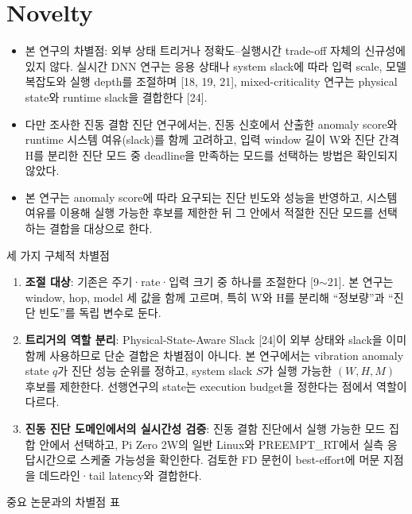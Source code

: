 \documentclass[10pt]{article}
\begin{document}
\section{Novelty}
\begin{itemize}
\item 본 연구의 차별점: 외부 상태 트리거나 정확도--실행시간 trade-off 자체의 신규성에 있지 않다. 실시간 DNN 연구는 응용 상태나 system slack에 따라 입력 scale, 모델 복잡도와 실행 depth를 조절하며 [18, 19, 21], mixed-criticality 연구는 physical state와 runtime slack을 결합한다 [24].
\item 다만 조사한 진동 결함 진단 연구에서는, 진동 신호에서 산출한 anomaly score와 runtime 시스템 여유(slack)를 함께 고려하고, 입력 window 길이 W와 진단 간격 H를 분리한 진단 모드 중 deadline을 만족하는 모드를 선택하는 방법은 확인되지 않았다.
\item 본 연구는 anomaly score에 따라 요구되는 진단 빈도와 성능을 반영하고, 시스템 여유를 이용해 실행 가능한 후보를 제한한 뒤 그 안에서 적절한 진단 모드를 선택하는 결합을 대상으로 한다.
\end{itemize}
\noindent 세 가지 구체적 차별점
\begin{enumerate}
\item \textbf{조절 대상}: 기존은 주기·rate·입력 크기 중 하나를 조절한다 [9$\sim$21]. 본 연구는 window, hop, model 세 값을 함께 고르며, 특히 W와 H를 분리해 ``정보량''과 ``진단 빈도''를 독립 변수로 둔다.
\item \textbf{트리거의 역할 분리}: Physical-State-Aware Slack [24]이 외부 상태와 slack을 이미 함께 사용하므로 단순 결합은 차별점이 아니다. 본 연구에서는 vibration anomaly state $q$가 진단 성능 순위를 정하고, system slack $S$가 실행 가능한 $(W,H,M)$ 후보를 제한한다. 선행연구의 state는 execution budget을 정한다는 점에서 역할이 다르다.
\item \textbf{진동 진단 도메인에서의 실시간성 검증}: 진동 결함 진단에서 실행 가능한 모드 집합 안에서 선택하고, Pi Zero 2W의 일반 Linux와 PREEMPT\_RT에서 실측 응답시간으로 스케줄 가능성을 확인한다. 검토한 FD 문헌이 best-effort에 머문 지점을 데드라인·tail latency와 결합한다.
\end{enumerate}
\noindent 중요 논문과의 차별점 표
\end{document}
